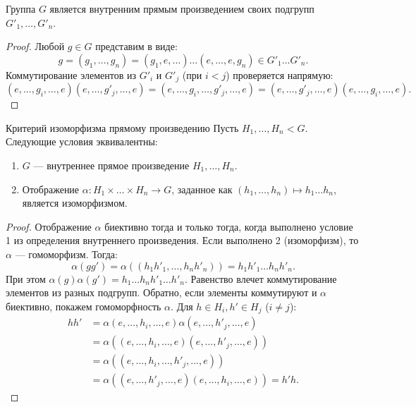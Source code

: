 \begin{Proposition}{}{}
	Группа $G$ является внутренним прямым произведением своих подгрупп $G'_1, \dots, G'_n$.
\end{Proposition}

\begin{proof}
	Любой $g \in G$ представим в виде:
	\[
	g = (g_1, \dots, g_n) = (g_1, e, \dots) \dots (e, \dots, e, g_n) \in G'_1 \dots G'_n.
	\]
	Коммутирование элементов из $G'_i$ и $G'_j$ (при $i < j$) проверяется напрямую:
	\[
	(e, \dots, g_i, \dots, e)(e, \dots, g'_j, \dots, e) = (e, \dots, g_i, \dots, g'_j, \dots, e) = (e, \dots, g'_j, \dots, e)(e, \dots, g_i, \dots, e).
	\]
\end{proof}

\begin{Proposition}{Критерий изоморфизма прямому произведению}{}
	Пусть $H_1, \dots, H_n < G$. Следующие условия эквивалентны:
	\begin{enumerate}
		\item $G$ --- внутреннее прямое произведение $H_1, \dots, H_n$.
		\item Отображение $\alpha \colon H_1 \times \dots \times H_n \to G$, заданное как $(h_1, \dots, h_n) \mapsto h_1 \dots h_n$, является изоморфизмом.
	\end{enumerate}
\end{Proposition}

\begin{proof}
	Отображение $\alpha$ биективно тогда и только тогда, когда выполнено условие 1 из определения внутреннего произведения. Если выполнено 2 (изоморфизм), то $\alpha$ --- гомоморфизм. Тогда:
	\[
	\alpha(gg') = \alpha((h_1 h'_1, \dots, h_n h'_n)) = h_1 h'_1 \dots h_n h'_n.
	\]
	При этом $\alpha(g)\alpha(g') = h_1 \dots h_n h'_1 \dots h'_n$. Равенство влечет коммутирование элементов из разных подгрупп. Обратно, если элементы коммутируют и $\alpha$ биективно, покажем гомоморфность $\alpha$. Для $h \in H_i, h' \in H_j$ ($i \neq j$):
	\begin{align*}
		hh' &= \alpha(e, \dots, h_i, \dots, e)\alpha(e, \dots, h'_j, \dots, e) \\
		&= \alpha((e, \dots, h_i, \dots, e)(e, \dots, h'_j, \dots, e)) \\
		&= \alpha((e, \dots, h_i, \dots, h'_j, \dots, e)) \\
		&= \alpha((e, \dots, h'_j, \dots, e)(e, \dots, h_i, \dots, e)) = h'h.
	\end{align*}
\end{proof}

